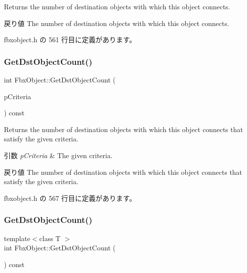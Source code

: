 Returns the number of destination objects with which this object connects. \begin{DoxyReturn}{戻り値}
The number of destination objects with which this object connects. 
\end{DoxyReturn}


 fbxobject.\+h の 561 行目に定義があります。

\mbox{\label{class_fbx_object_a46183e2905f10779c57389dc4ec3a5de}} 
\subsubsection{\texorpdfstring{Get\+Dst\+Object\+Count()}{GetDstObjectCount()}\hspace{0.1cm}{\footnotesize\ttfamily [2/4]}}
{\footnotesize\ttfamily int Fbx\+Object\+::\+Get\+Dst\+Object\+Count (\begin{DoxyParamCaption}\item[{const \hyperlink{class_fbx_criteria}{Fbx\+Criteria} \&}]{p\+Criteria }\end{DoxyParamCaption}) const\hspace{0.3cm}{\ttfamily [inline]}}

Returns the number of destination objects with which this object connects that satisfy the given criteria. 
\begin{DoxyParams}{引数}
{\em p\+Criteria} & The given criteria. \\
\hline
\end{DoxyParams}
\begin{DoxyReturn}{戻り値}
The number of destination objects with which this object connects that satisfy the given criteria. 
\end{DoxyReturn}


 fbxobject.\+h の 567 行目に定義があります。

\mbox{\label{class_fbx_object_a1a642124ddabd14884fc0c85793a5c6d}} 
\subsubsection{\texorpdfstring{Get\+Dst\+Object\+Count()}{GetDstObjectCount()}\hspace{0.1cm}{\footnotesize\ttfamily [3/4]}}
{\footnotesize\ttfamily template$<$class T $>$ \\
int Fbx\+Object\+::\+Get\+Dst\+Object\+Count (\begin{DoxyParamCaption}{ }\end{DoxyParamCaption}) const\hspace{0.3cm}{\ttfamily [inline]}}

